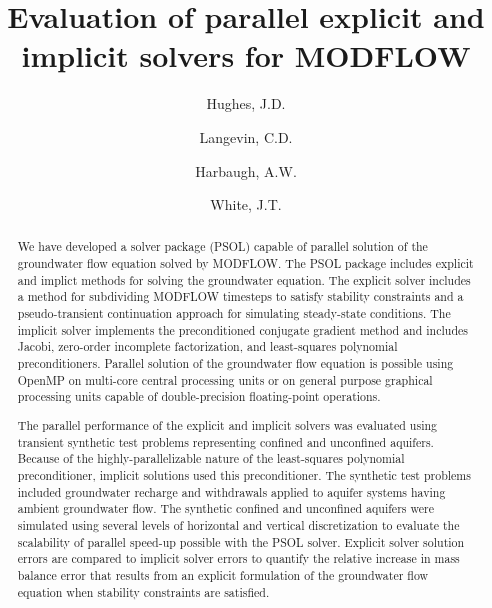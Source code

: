 \documentclass[12pt]{article} %
\title{Evaluation of parallel explicit and \\implicit solvers for MODFLOW}
\author{Hughes, J.D. \and Langevin, C.D. \and Harbaugh, A.W. \and White, J.T.}
\begin{document}
\maketitle

\begin{abstract}

We have developed a solver package (PSOL) capable of parallel solution of the groundwater flow equation solved by MODFLOW. The PSOL package includes explicit and implict methods for solving the groundwater equation. The explicit solver includes a method for subdividing MODFLOW timesteps to satisfy stability constraints and a pseudo-transient continuation approach for simulating steady-state conditions. The implicit solver implements the preconditioned conjugate gradient method and includes Jacobi, zero-order incomplete factorization, and least-squares polynomial preconditioners. Parallel solution of the groundwater flow equation is possible using OpenMP on multi-core central processing units or on general purpose graphical processing units capable of double-precision floating-point operations.

The parallel performance of the explicit and implicit solvers was evaluated using transient synthetic test problems representing confined and unconfined aquifers. Because of the highly-parallelizable nature of the least-squares polynomial preconditioner, implicit solutions used this preconditioner. The synthetic test problems included groundwater recharge and withdrawals applied to aquifer systems having ambient groundwater flow. The synthetic confined and unconfined aquifers were simulated using several levels of horizontal and vertical discretization to evaluate the scalability of parallel speed-up possible with the PSOL solver. Explicit solver solution errors are compared to implicit solver errors to quantify the relative increase in mass balance error that results from an explicit formulation of the groundwater flow equation when stability constraints are satisfied.

\end{abstract}
\end{document}
